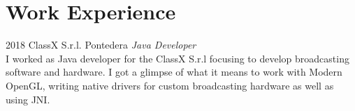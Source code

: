 \documentclass[]{friggeri-cv}
\begin{document}
\patchcmd{\entry}{14.8cm}{11.8cm}{}{}
\section{Work Experience}
\vspace{-3mm}
\begin{entrylist}
\entry
{2018}
{ClassX S.r.l.}
{Pontedera}
{\emph{Java Developer} \\
I worked as Java developer for the ClassX S.r.l focusing to develop broadcasting software and hardware. I got a glimpse of what it means to work with Modern OpenGL, writing native drivers for custom broadcasting hardware as well as using JNI.}
\end{entrylist}

\clearpage

\end{document}
